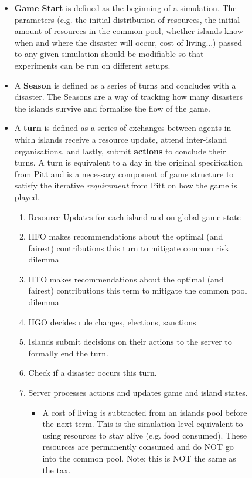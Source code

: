 \begin{figure}[!htb]
    \begin{itemize}
        \item \textbf{Game Start} is defined as the beginning of a simulation. The parameters (e.g. the initial distribution of resources, the initial amount of resources in the common pool, whether islands know when and where the disaster will occur, cost of living...) passed to any given simulation should be modifiable so that experiments can be run on different setups.
        \item A \textbf{Season} is defined as a series of turns and concludes with a disaster. The Seasons are a way of tracking how many disasters the islands survive and formalise the flow of the game.
        \item A \textbf{turn} is defined as a series of exchanges between agents in which islands receive a resource update, attend inter-island organisations, and lastly, submit \textbf{actions} to conclude their turns. A turn is equivalent to a day in the original specification from Pitt and is a necessary component of game structure to satisfy the iterative \textit{requirement} from Pitt on how the game is played.
            \begin{enumerate}
                \item Resource Updates for each island and on global game state
                \item IIFO makes recommendations about the optimal (and fairest) contributions this turn to mitigate common risk dilemma 
                \item IITO makes recommendations about the optimal (and fairest) contributions this term to mitigate the common pool dilemma
                \item IIGO decides rule changes, elections, sanctions
                \item Islands submit decisions on their actions to the server to formally end the turn.
                \item Check if a disaster occurs this turn.
                \item Server processes actions and updates game and island states.
                    \begin{itemize}
                        \item A cost of living is subtracted from an islands pool before the next term. This is the simulation-level equivalent to using resources to stay alive (e.g. food consumed). These resources are permanently consumed and do NOT go into the common pool. Note: this is NOT the same as the tax. 

\end{itemize}
\end{enumerate}
\end{itemize}
\end{figure}
